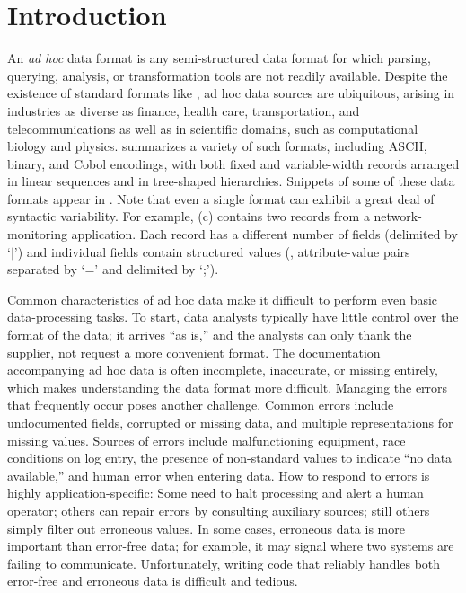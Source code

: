 \section{Introduction}
\label{sec:intro}

An {\em ad hoc} data format is any semi-structured data format for which
parsing, querying, analysis, or transformation tools are not readily
available.  Despite the existence of standard
formats like \xml{}, ad hoc data sources are ubiquitous,
arising in industries as diverse as finance, health care,
transportation, and telecommunications as well as in scientific
domains, such as computational biology and physics.
 summarizes a variety of such formats,
including ASCII, binary, and Cobol encodings, with both fixed and
variable-width records arranged in linear sequences and in tree-shaped
hierarchies.  Snippets of some of these data formats appear in .
Note that even a single format can exhibit a great deal of
syntactic variability.  For example, (c)
contains two records from a network-monitoring application.  
Each record has a different number of fields (delimited by `$|$') and
individual fields contain structured values (\eg{},
attribute-value pairs separated by `=' and delimited by `;').

Common characteristics of ad hoc data make it difficult to perform
even basic data-processing tasks.  To start, data analysts typically
have little control over the format of the data;  it
arrives ``as is,'' and the analysts can only thank the supplier,
not request a more convenient format.  The documentation accompanying
ad hoc data is often incomplete, inaccurate, or missing entirely,
which makes understanding the data format more difficult.
Managing the errors that frequently occur poses another challenge. Common errors include undocumented fields, corrupted or missing data, and multiple representations for missing values.  Sources of errors include
malfunctioning equipment, race conditions on log entry, the
presence of non-standard values to indicate ``no data available,'' and
human error when entering data.  How to respond to errors is highly 
application-specific: Some need to halt processing and
alert a human operator; others can repair errors by consulting 
auxiliary sources; still others simply filter out erroneous values. 
In some cases, erroneous data is more important than error-free data; 
for example, it may signal where two systems are failing to communicate.
Unfortunately, writing code that reliably handles
both error-free and erroneous data is difficult and tedious.

